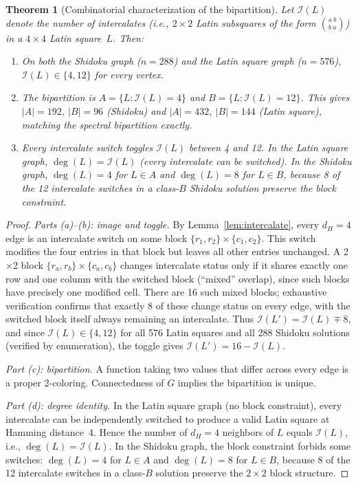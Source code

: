 \documentclass[11pt]{article}
\newtheorem{theorem}{Theorem}[section]
\theoremstyle{definition}
\theoremstyle{remark}
\newcommand{\Ic}{\mathcal{I}}
\begin{document}
\begin{theorem}[Combinatorial characterization of the bipartition]\label{thm:intercalate_char}
Let $\Ic(L)$ denote the number of \emph{intercalates} (i.e., $2 \times 2$ Latin subsquares of the form $\binom{a\ b}{b\ a}$) in a $4 \times 4$ Latin square~$L$. Then:
\begin{enumerate}[nosep, label=(\alph*)]
\item On both the Shidoku graph ($n = 288$) and the Latin square graph ($n = 576$), $\Ic(L) \in \{4, 12\}$ for every vertex.
\item The bipartition is $A = \{L : \Ic(L) = 4\}$ and $B = \{L : \Ic(L) = 12\}$. This gives $|A| = 192$, $|B| = 96$ (Shidoku) and $|A| = 432$, $|B| = 144$ (Latin square), matching the spectral bipartition exactly.
\item Every intercalate switch toggles $\Ic(L)$ between 4 and 12.  In the Latin square graph, $\deg(L) = \Ic(L)$ (every intercalate can be switched).  In the Shidoku graph, $\deg(L) = 4$ for $L \in A$ and $\deg(L) = 8$ for $L \in B$, because 8 of the 12 intercalate switches in a class-$B$ Shidoku solution preserve the block constraint.
\end{enumerate}
\end{theorem}

\begin{proof}
\emph{Parts (a)--(b): image and toggle.}
By Lemma~\ref{lem:intercalate}, every $d_H = 4$ edge is an intercalate switch on some block $\{r_1, r_2\} \times \{c_1, c_2\}$.  This switch modifies the four entries in that block but leaves all other entries unchanged.  A 2$\times$2 block $\{r_a, r_b\} \times \{c_a, c_b\}$ changes intercalate status only if it shares exactly one row and one column with the switched block (``mixed'' overlap), since such blocks have precisely one modified cell.  There are 16 such mixed blocks; exhaustive verification confirms that exactly 8 of these change status on every edge, with the switched block itself always remaining an intercalate.  Thus $\Ic(L') = \Ic(L) \mp 8$, and since $\Ic(L) \in \{4, 12\}$ for all 576 Latin squares and all 288 Shidoku solutions (verified by enumeration), the toggle gives $\Ic(L') = 16 - \Ic(L)$.

\emph{Part (c): bipartition.}
A function taking two values that differ across every edge is a proper 2-coloring.  Connectedness of $G$ implies the bipartition is unique.

\emph{Part (d): degree identity.}
In the Latin square graph (no block constraint), every intercalate can be independently switched to produce a valid Latin square at Hamming distance~4.  Hence the number of $d_H = 4$ neighbors of $L$ equals $\Ic(L)$, i.e., $\deg(L) = \Ic(L)$.  In the Shidoku graph, the block constraint forbids some switches: $\deg(L) = 4$ for $L \in A$ and $\deg(L) = 8$ for $L \in B$, because 8 of the 12 intercalate switches in a class-$B$ solution preserve the $2 \times 2$ block structure.
\end{proof}
\end{document}
